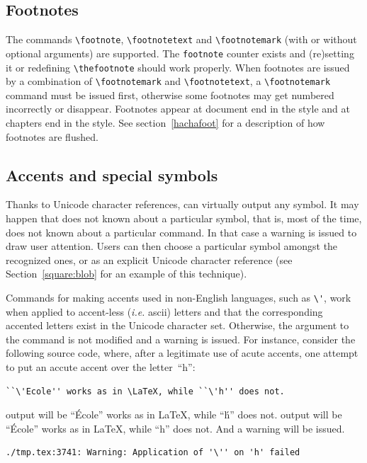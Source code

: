 \subsection{Footnotes}
The commands \verb+\footnote+,
\verb+\footnotetext+ and \verb+\footnotemark+ (with or without
optional arguments) are supported.
The \verb+footnote+ counter exists and (re)setting it or redefining
\verb+\thefootnote+ should work properly.
When footnotes are issued by a combination of \verb+\footnotemark+ and
\verb+\footnotetext+, a \verb+\footnotemark+
command must be issued
first, otherwise some footnotes may get numbered incorrectly or disappear.
Footnotes appear at document end in the  style and
at chapters end in the  style.
See section~\ref{hachafoot} for a description of how footnotes are flushed.


\subsection{Accents\label{accents} and special symbols}
Thanks to Unicode character references, \hevea{} can virtually output
any symbol.
It may happen that \hevea{} does not known about a particular symbol,
that is, most of the time, \hevea{} does not known about a particular
command. In that case a warning is issued to draw user attention.
Users can then choose a particular symbol amongst the recognized ones,
or as an explicit Unicode character reference (see
Section~\ref{square:blob} for an example of this technique).

Commands for making accents used in non-English languages, such as
\verb+\'+, work when applied to accent-less (\emph{i.e.} ascii)
letters and that the corresponding accented letters exist
in the Unicode character set.
Otherwise, the argument to the command is not modified
and a warning is issued.
For instance, consider the following source code, where, after a
legitimate use of acute accents, one attempt to put an accute accent
over the letter~``h'':
\begin{verbatim}
``\'Ecole'' works as in \LaTeX, while ``\'h'' does not.
\end{verbatim}
\ifhevea
\hevea{} output will be ``\'Ecole'' works as in \LaTeX, while ``\'h'' does not.
\else
\hevea{} output will  be ``\'Ecole'' works as in \LaTeX, while ``h'' does not.
\fi{}
And a warning will be issued.
\begin{verbatim}
./tmp.tex:3741: Warning: Application of '\'' on 'h' failed
\end{verbatim}

